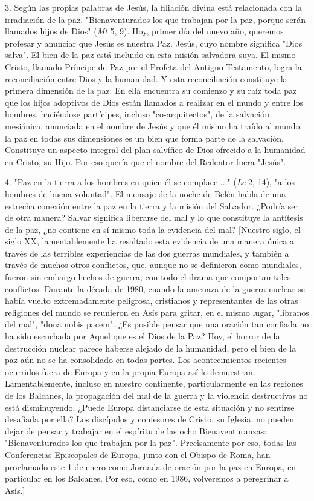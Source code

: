 \begin{body}
3. Según las propias palabras de Jesús, la filiación divina está relacionada con la irradiación de la paz. "Bienaventurados los que trabajan por la paz, porque serán llamados hijos de Dios" (\emph{Mt} 5, 9). Hoy, primer día del nuevo año, queremos profesar y anunciar que Jesús es nuestra Paz. Jesús, cuyo nombre significa "Dios salva". El bien de la paz está incluido en esta misión salvadora suya. El mismo Cristo, llamado Príncipe de Paz por el Profeta del Antiguo Testamento, logra la reconciliación entre Dios y la humanidad. Y esta reconciliación constituye la primera dimensión de la paz. En ella encuentra su comienzo y su raíz toda paz que los hijos adoptivos de Dios están llamados a realizar en el mundo y entre los hombres, haciéndose partícipes, incluso "co-arquitectos", de la salvación mesiánica, anunciada en el nombre de Jesús y que él mismo ha traído al mundo: la paz en todas sus dimensiones es un bien que forma parte de la salvación. Constituye un aspecto integral del plan salvífico de Dios ofrecido a la humanidad en Cristo, su Hijo. Por eso quería que el nombre del Redentor fuera "Jesús".

4. "Paz en la tierra a los hombres en quien él se complace ..." (\emph{Lc} 2, 14), "a los hombres de buena voluntad". El mensaje de la noche de Belén habla de una estrecha conexión entre la paz en la tierra y la misión del Salvador. ¿Podría ser de otra manera? Salvar significa liberarse del mal y lo que constituye la antítesis de la paz, ¿no contiene en sí mismo toda la evidencia del mal? {[}Nuestro siglo, el siglo XX, lamentablemente ha resaltado esta evidencia de una manera única a través de las terribles experiencias de las dos guerras mundiales, y también a través de muchos otros conflictos, que, aunque no se definieron como mundiales, fueron sin embargo hechos de guerra, con todo el drama que comportan tales conflictos. Durante la década de 1980, cuando la amenaza de la guerra nuclear se había vuelto extremadamente peligrosa, cristianos y representantes de las otras religiones del mundo se reunieron en Asís para gritar, en el mismo lugar, "líbranos del mal", "dona nobis pacem". ¿Es posible pensar que una oración tan confiada no ha sido escuchada por Aquel que es el Dios de la Paz? Hoy, el horror de la destrucción nuclear parece haberse alejado de la humanidad, pero el bien de la paz aún no se ha consolidado en todas partes. Los acontecimientos recientes ocurridos fuera de Europa y en la propia Europa así lo demuestran. Lamentablemente, incluso en nuestro continente, particularmente en las regiones de los Balcanes, la propagación del mal de la guerra y la violencia destructivas no está disminuyendo. ¿Puede Europa distanciarse de esta situación y no sentirse desafiada por ella? Los discípulos y confesores de Cristo, su Iglesia, no pueden dejar de pensar y trabajar en el espíritu de las ocho Bienaventuranzas: "Bienaventurados los que trabajan por la paz". Precisamente por eso, todas las Conferencias Episcopales de Europa, junto con el Obispo de Roma, han proclamado este 1 de enero como Jornada de oración por la paz en Europa, en particular en los Balcanes. Por eso, como en 1986, volveremos a peregrinar a Asís.{]}


\end{body}
